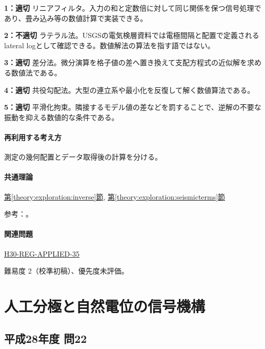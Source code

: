 \noindent\textbf{1：適切} リニアフィルタ。入力の和と定数倍に対して同じ関係を保つ信号処理であり、畳み込み等の数値計算で実装できる。\par

\noindent\textbf{2：不適切} ラテラル法。USGSの電気検層資料では電極間隔と配置で定義されるlateral logとして確認できる。数値解法の算法を指す語ではない。\par

\noindent\textbf{3：適切} 差分法。微分演算を格子値の差へ置き換えて支配方程式の近似解を求める数値法である。\par

\noindent\textbf{4：適切} 共役勾配法。大型の連立系や最小化を反復して解く数値算法である。\par

\noindent\textbf{5：適切} 平滑化拘束。隣接するモデル値の差などを罰することで、逆解の不要な振動を抑える数値的な条件である。\par

\paragraph{再利用する考え方} 測定の幾何配置とデータ取得後の計算を分ける。

\paragraph{共通理論} \hyperref[theory:exploration:inverse]{第\ref*{theory:exploration:inverse}節}, \hyperref[theory:exploration:seismicterms]{第\ref*{theory:exploration:seismicterms}節}

\par 参考：\cite{usgs_lateral_logging,pygimli_inversion,mit_signals2010}。

\paragraph{関連問題} \hyperref[q:h30-reg-applied-35]{H30-REG-APPLIED-35}

\par 難易度 2（校準初稿）、優先度未評価。

\section{人工分極と自然電位の信号機構}

\subsection{平成28年度 問22}
\label{q:h28-reg-applied-22}

